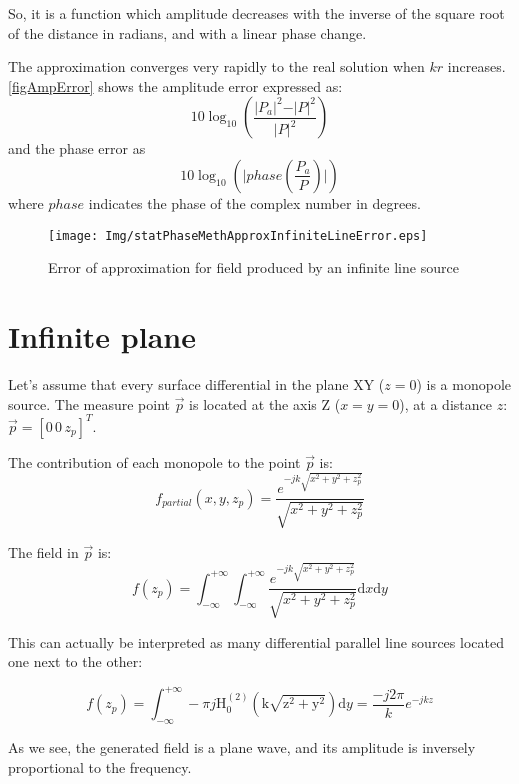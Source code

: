 So, it is a function which amplitude decreases with the inverse of the square root of the distance in radians, and with a linear phase change.

The approximation converges very rapidly to the real solution when $kr$ increases. \autoref{figAmpError} shows the amplitude error expressed as:
\begin{equation}
	10 \log_{10} \left( \frac{\vert P_a \vert^2 - \vert P \vert^2}{\vert P \vert^2} \right)
\end{equation}
and the phase error as
\begin{equation}
	10 \log_{10} \left( \vert phase\left(\frac{P_a}{P}\right) \vert \right)
\end{equation}
where $phase$ indicates the phase of the complex number in degrees.

\begin{figure}[h]
\centering
\texttt{[image: Img/statPhaseMethApproxInfiniteLineError.eps]}
\caption{Error of approximation for field produced by an infinite line source}
\end{figure}

\section{Infinite plane}
Let's assume that every surface differential in the plane XY ($z = 0$) is a monopole source. The measure point $\vec{p}$ is located at the axis Z ($x = y = 0$), at a distance $z$: $\vec{p} = [0\, 0\, z_p]^T$.

The contribution of each monopole to the point $\vec{p}$ is:
\begin{equation}
f_{partial}(x, y, z_p) = \frac{e^{-j k \sqrt{x^2 + y^2 + z_p^2}}}{\sqrt{x^2 + y^2 + z_p^2}}
\end{equation}

The field in $\vec{p}$ is:
\begin{equation}
f(z_p) = \int_{-\infty}^{+\infty} \int_{-\infty}^{+\infty} \frac{e^{-j k \sqrt{x^2 + y^2 + z_p^2}}}{\sqrt{x^2 + y^2 + z_p^2}} \mathrm{d}x \mathrm{d}y
\end{equation}

This can actually be interpreted as many differential parallel line sources located one next to the other:

\begin{equation}
f(z_p) = \int_{-\infty}^{+\infty} -\pi j \mathrm{H_0^{(2)}(k \sqrt{z^2 + y^2})} \mathrm{d}y = \frac{-j 2\pi}{k} e^{-j k z}
\end{equation}

As we see, the generated field is a plane wave, and its amplitude is inversely proportional to the frequency.

